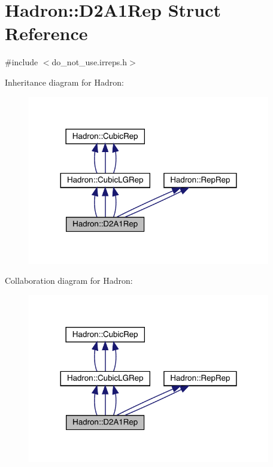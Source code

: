 \hypertarget{structHadron_1_1D2A1Rep}{}\section{Hadron\+:\+:D2\+A1\+Rep Struct Reference}
\label{structHadron_1_1D2A1Rep}


{\ttfamily \#include $<$do\+\_\+not\+\_\+use.\+irreps.\+h$>$}



Inheritance diagram for Hadron\+:
\nopagebreak
\begin{figure}[H]
\begin{center}
\leavevmode
\includegraphics[width=300pt]{dd/de6/structHadron_1_1D2A1Rep__inherit__graph}
\end{center}
\end{figure}


Collaboration diagram for Hadron\+:
\nopagebreak
\begin{figure}[H]
\begin{center}
\leavevmode
\includegraphics[width=300pt]{d9/da3/structHadron_1_1D2A1Rep__coll__graph}
\end{center}
\end{figure}

